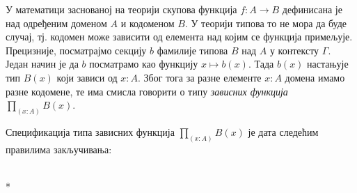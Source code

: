 \documentclass[12pt,oneside]{memoir}
\begin{document}
У математици заснованој на теорији скупова функција $f : A \to B$ дефинисана је над одређеним доменом $A$ и кодоменом $B$. У теорији типова то не мора да буде случај, тј. кодомен може зависити од елемента над којим се функција примељује. Прецизније, посматрајмо секцију $b$ фамилије типова $B$ над $A$ у контексту $\Gamma$. Један начин је да $b$ посматрамо као функцију $x \mapsto b(x)$. Тада $b(x)$ настањује тип $B(x)$ који зависи од $x : A$. Због тога за разне елементе $x : A$ домена
имамо разне кодомене, те има смисла говорити о типу \emph{зависних функција} $\prod_{(x : A)} B(x)$. 

Спецификација типа зависних функција $\prod_{(x:A)} B(x)$ је дата следећим правилима закључивања:

\begin{samepage}
    \begin{center}
    \begin{minipage}{0.3\textwidth}
        \begin{prooftree}
        \end{prooftree}
    \end{minipage}
    \begin{minipage}{0.35\textwidth}
        \begin{prooftree}
        \end{prooftree}
    \end{minipage}
    \begin{minipage}{0.3\textwidth}
        \begin{prooftree}
        \end{prooftree}
    \end{minipage}
    \\*
    \bigskip%
    \begin{minipage}{0.4\textwidth}
        \begin{prooftree}
        \end{prooftree}
    \end{minipage}
    \begin{minipage}{0.4\textwidth}
        \begin{prooftree}
        \end{prooftree}
    \end{minipage}
    \end{center}
\end{samepage}
\end{document}
